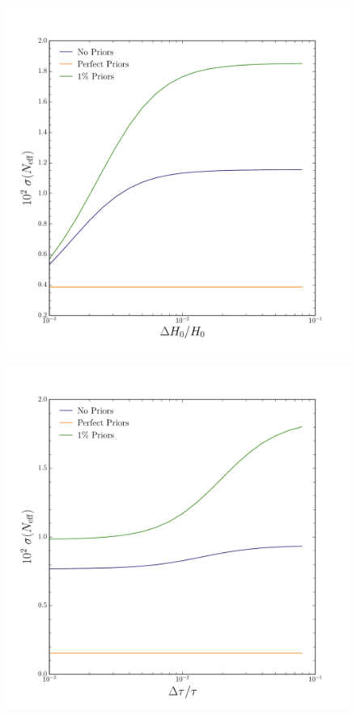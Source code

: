 \documentclass[aps,prl,preprint,groupedaddress]{revtex4-1}
\begin{document}
\begin{figure}[htbp]
\begin{center}
\includegraphics[scale=0.6]{h0_fisher.pdf}
\caption{}
\label{fig:phi-cl-noise}
\end{center}
\end{figure}

\begin{figure}[htbp]
\begin{center}
\includegraphics[scale=0.6]{tau_fisher.pdf}
\caption{}
\label{fig:phi-cl-noise}
\end{center}
\end{figure}
\end{document}
